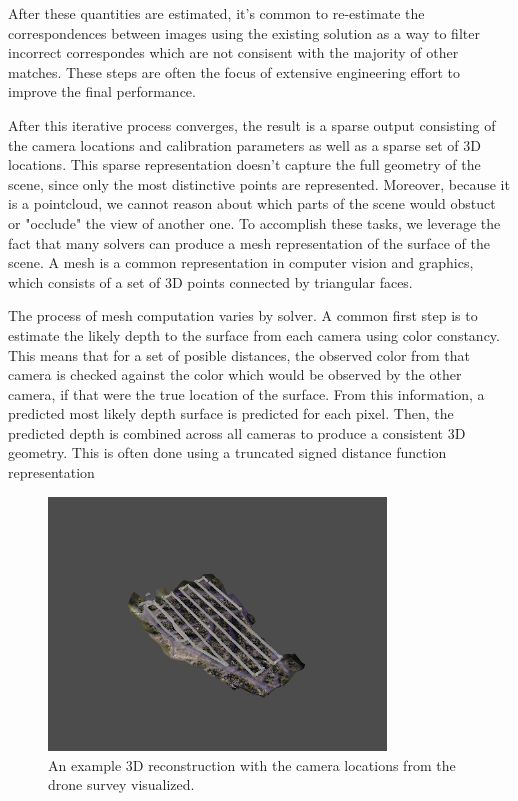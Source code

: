 After these quantities are estimated, it's common to re-estimate the correspondences between images using the existing solution as a way to filter incorrect correspondes which are not consisent with the majority of other matches. These steps are often the focus of extensive engineering effort to improve the final performance. 

After this iterative process converges, the result is a sparse output consisting of the camera locations and calibration parameters as well as a sparse set of 3D locations. This sparse representation doesn't capture the full geometry of the scene, since only the most distinctive points are represented. Moreover, because it is a pointcloud, we cannot reason about which parts of the scene would obstuct or "occlude" the view of another one. To accomplish these tasks, we leverage the fact that many solvers can produce a mesh representation of the surface of the scene. A mesh is a common representation in computer vision and graphics, which consists of a set of 3D points connected by triangular faces. 

The process of mesh computation varies by solver. A common first step is to estimate the likely depth to the surface from each camera using color constancy. This means that for a set of posible distances, the observed color from that camera is checked against the color which would be observed by the other camera, if that were the true location of the surface. From this information, a predicted most likely depth surface is predicted for each pixel. Then, the predicted depth is combined across all cameras to produce a consistent 3D geometry. This is often done using a truncated signed distance function representation \cite{} 

\begin{figure}
    \centering
    \includegraphics[width=0.8\textwidth, trim={4cm 3cm 4cm 4cm}, clip]{figs/methods/structure_from_motion/camera estimation.png}
    \caption{An example 3D reconstruction with the camera locations from the drone survey visualized.}
    \label{fig:camera-locations}
\end{figure}


